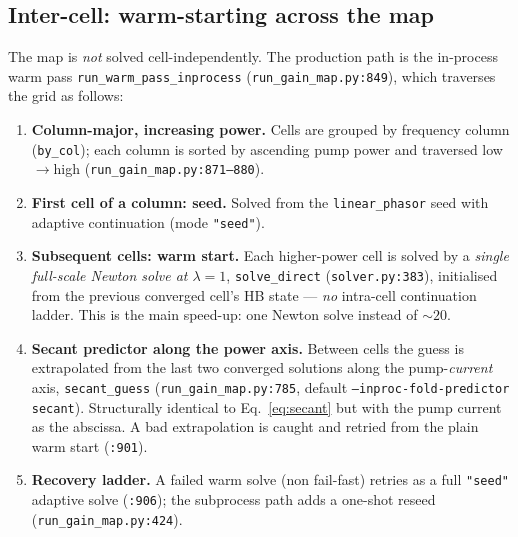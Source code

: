 \documentclass[11pt]{article}
\newcommand{\code}[1]{\texttt{\small #1}}
\begin{document}
\subsection{Inter-cell: warm-starting across the map}
\label{sec:intercell}

The map is \emph{not} solved cell-independently. The production path is the
in-process warm pass \code{run\_warm\_pass\_inprocess}
(\code{run\_gain\_map.py:849}), which traverses the grid as follows:

\begin{enumerate}[leftmargin=*]
  \item \textbf{Column-major, increasing power.} Cells are grouped by frequency
    column (\code{by\_col}); each column is sorted by ascending pump power and
    traversed low$\to$high (\code{run\_gain\_map.py:871--880}).
  \item \textbf{First cell of a column: seed.} Solved from the
    \code{linear\_phasor} seed with adaptive continuation (mode \code{"seed"}).
  \item \textbf{Subsequent cells: warm start.} Each higher-power cell is solved
    by a \emph{single full-scale Newton solve at $\lambda=1$},
    \code{solve\_direct} (\code{solver.py:383}), initialised from the previous
    converged cell's HB state --- \emph{no} intra-cell continuation ladder. This
    is the main speed-up: one Newton solve instead of $\sim 20$.
  \item \textbf{Secant predictor along the power axis.} Between cells the guess
    is extrapolated from the last two converged solutions along the
    pump-\emph{current} axis, \code{secant\_guess} (\code{run\_gain\_map.py:785},
    default \code{--inproc-fold-predictor secant}). Structurally identical to
    Eq.~\ref{eq:secant} but with the pump current as the abscissa. A bad
    extrapolation is caught and retried from the plain warm start
    (\code{:901}).
  \item \textbf{Recovery ladder.} A failed warm solve (non fail-fast) retries as
    a full \code{"seed"} adaptive solve (\code{:906}); the subprocess path adds a
    one-shot reseed (\code{run\_gain\_map.py:424}).
\end{enumerate}
\end{document}
